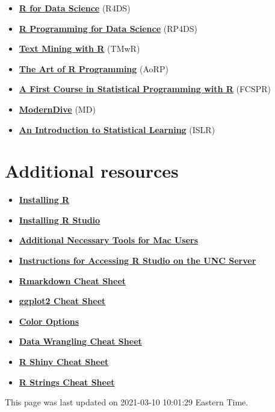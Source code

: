\documentclass[
]{article}
\begin{document}
\begin{itemize}
\item
  \textbf{\href{https://r4ds.had.co.nz/}{R for Data Science}} (R4DS)
\item
  \textbf{\href{https://drive.google.com/file/d/1XVF5v4MTBhIp_dq9MzTI0TtPfVrF6eaZ/view?usp=sharing}{R
  Programming for Data Science}} (RP4DS)
\item
  \textbf{\href{https://www.tidytextmining.com/}{Text Mining with R}}
  (TMwR)
\item
  \textbf{\href{https://drive.google.com/file/d/1gR7Yr9-pIZ-f315bZCXfDj9yPWaZDflD/view?usp=sharing}{The
  Art of R Programming}} (AoRP)
\item
  \textbf{\href{https://drive.google.com/file/d/1NBadpF5MLWI3AFsyWo3nbpQnL8sWeZdT/view?usp=sharing}{A
  First Course in Statistical Programming with R}} (FCSPR)
\item
  \textbf{\href{https://moderndive.com/index.html}{ModernDive}} (MD)
\item
  \textbf{\href{https://drive.google.com/file/d/1jKxVWG89KvWr_-70sOeEeLK4CUB09sRu/view?usp=sharing}{An
  Introduction to Statistical Learning}} (ISLR)
\end{itemize}

\hypertarget{additional-resources}{%
\section{\texorpdfstring{\textbf{Additional
resources}}{Additional resources}}\label{additional-resources}}

\begin{itemize}
\item
  \textbf{\href{https://cran.r-project.org/}{Installing R}}
\item
  \textbf{\href{https://www.rstudio.com/products/rstudio/\#Desktop}{Installing
  R Studio}}
\item
  \textbf{\href{https://mac.r-project.org/tools/}{Additional Necessary
  Tools for Mac Users}}
\item
  \textbf{\href{https://drive.google.com/file/d/1ATZO-wpuqzHbXVnJqm7wXpt-yfMbo2Jy/view?usp=sharing}{Instructions
  for Accessing R Studio on the UNC Server}}
\item
  \textbf{\href{https://www.rstudio.com/wp-content/uploads/2016/03/rmarkdown-cheatsheet-2.0.pdf}{Rmarkdown
  Cheat Sheet}}
\item
  \textbf{\href{https://www.rstudio.com/wp-content/uploads/2015/03/ggplot2-cheatsheet.pdf}{ggplot2
  Cheat Sheet}}
\item
  \textbf{\href{https://paulvanderlaken.files.wordpress.com/2017/08/ggplot2-color-colours-names-cheatsheet.png?w=559\&h=1024}{Color
  Options}}
\item
  \textbf{\href{https://www.rstudio.com/wp-content/uploads/2015/02/data-wrangling-cheatsheet.pdf}{Data
  Wrangling Cheat Sheet}}
\item
  \textbf{\href{https://shiny.rstudio.com/images/shiny-cheatsheet.pdf}{R
  Shiny Cheat Sheet}}
\item
  \textbf{\href{https://evoldyn.gitlab.io/evomics-2018/ref-sheets/R_strings.pdf}{R
  Strings Cheat Sheet}}
\end{itemize}

This page was last updated on 2021-03-10 10:01:29 Eastern Time.
\end{document}
